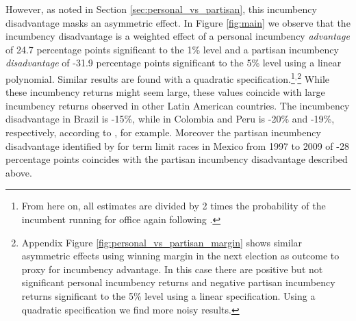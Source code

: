 \documentclass[12pt]{amsart}
\numberwithin{equation}{section}
\theoremstyle{definition}
\theoremstyle{definition}
\theoremstyle{definition}
\begin{document}
However, as noted in Section \ref{sec:personal_vs_partisan}, this incumbency disadvantage masks an asymmetric effect. In Figure \ref{fig:main} we observe that the incumbency disadvantage is a weighted effect of a personal incumbency \emph{advantage} of 24.7 percentage points significant to the 1\% level and a partisan incumbency \emph{disadvantage} of -31.9 percentage points significant to the 5\% level using a linear polynomial. Similar results are found with a quadratic specification.\footnote{From here on, all estimates are divided by 2 times the probability of the incumbent running for office again following \citet{erikson_titiunik_2015}.}$^,$\footnote{Appendix Figure \ref{fig:personal_vs_partisan_margin} shows similar asymmetric effects using winning margin in the next election as outcome to proxy for incumbency advantage. In this case there are positive but not significant personal incumbency returns and negative partisan incumbency returns significant to the 5\% level using a linear specification. Using a quadratic specification we find more noisy results.} While these incumbency returns might seem large, these values coincide with large incumbency returns observed in other Latin American countries. The incumbency disadvantage in Brazil is -15\%, while in Colombia and Peru is -20\% and -19\%, respectively, according to \citet{klasnja_titiunik_2017}, for example. Moreover the partisan incumbency disadvantage identified by \citet{klasnja_titiunik_2017} for term limit races in Mexico from 1997 to 2009 of -28 percentage points coincides with the partisan incumbency disadvantage described above. 
   
\end{document}
